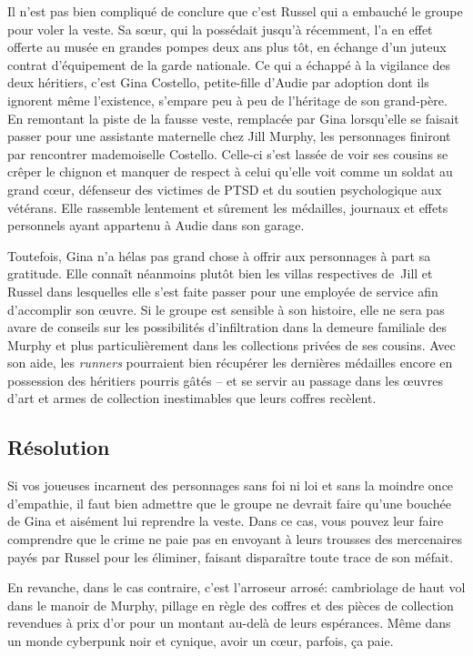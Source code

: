 Il n'est pas bien compliqué de conclure que c'est Russel qui a embauché le groupe pour voler la veste.
Sa sœur, qui la possédait jusqu'à récemment, l'a en effet offerte au musée en grandes pompes deux ans plus tôt, en échange d'un juteux contrat d'équipement de la garde nationale.
Ce qui a échappé à la vigilance des deux héritiers, c'est Gina Costello, petite-fille d'Audie par adoption dont ils ignorent même l'existence, s'empare peu à peu de l'héritage de son grand-père.
En remontant la piste de la fausse veste, remplacée par Gina lorsqu'elle se faisait passer pour une assistante maternelle chez Jill Murphy, les personnages finiront par rencontrer mademoiselle Costello.
Celle-ci s'est lassée de voir ses cousins se crêper le chignon et manquer de respect à celui qu'elle voit comme un soldat au grand cœur, défenseur des victimes de PTSD et du soutien psychologique aux vétérans.
Elle rassemble lentement et sûrement les médailles, journaux et effets personnels ayant appartenu à Audie dans son garage.

Toutefois, Gina n'a hélas pas grand chose à offrir aux personnages à part sa gratitude.
Elle connaît néanmoins plutôt bien les villas respectives de Jill et Russel dans lesquelles elle s'est faite passer pour une employée de service afin d'accomplir son œuvre.
Si le groupe est sensible à son histoire, elle ne sera pas avare de conseils sur les possibilités d'infiltration dans la demeure familiale des Murphy et plus particulièrement dans les collections privées de ses cousins.
Avec son aide, les \emph{runners} pourraient bien récupérer les dernières médailles encore en possession des héritiers pourris gâtés -- et se servir au passage dans les œuvres d'art et armes de collection inestimables que leurs coffres recèlent.

\subsection{Résolution}

Si vos joueuses incarnent des personnages sans foi ni loi et sans la moindre once d'empathie, il faut bien admettre que le groupe ne devrait faire qu'une bouchée de Gina et aisément lui reprendre la veste.
Dans ce cas, vous pouvez leur faire comprendre que le crime ne paie pas en envoyant à leurs trousses des mercenaires payés par Russel pour les éliminer, faisant disparaître toute trace de son méfait.

En revanche, dans le cas contraire, c'est l'arroseur arrosé: cambriolage de haut vol dans le manoir de Murphy, pillage en règle des coffres et des pièces de collection revendues à prix d'or pour un montant au-delà de leurs espérances.
Même dans un monde cyberpunk noir et cynique, avoir un cœur, parfois, ça paie.

